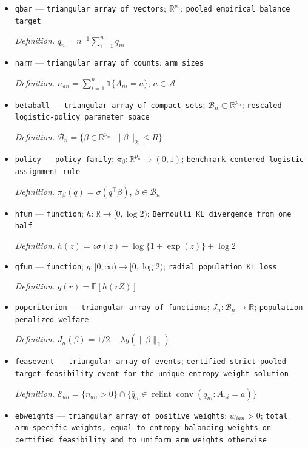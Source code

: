 \documentclass{article}
\begin{document}
\begin{itemize}
  \item \texttt{qbar} --- \texttt{triangular array of vectors}; \(\mathbb R^{p_n}\); \texttt{pooled empirical balance target}
  \par\smallskip\noindent\emph{Definition.} \(\bar q_n=n^{-1}\sum_{i=1}^{n}q_{ni}\)
  \item \texttt{narm} --- \texttt{triangular array of counts}; \texttt{arm sizes}
  \par\smallskip\noindent\emph{Definition.} \(n_{an}=\sum_{i=1}^{n}\mathbf 1\{A_{ni}=a\}\), \(a\in\mathcal A\)
  \item \texttt{betaball} --- \texttt{triangular array of compact sets}; \(\mathcal B_n\subset\mathbb R^{p_n}\); \texttt{rescaled logistic-\allowbreak{}policy parameter space}
  \par\smallskip\noindent\emph{Definition.} \(\mathcal B_n=\{\beta\in\mathbb R^{p_n}:\|\beta\|_2\le R\}\)
  \item \texttt{policy} --- \texttt{policy family}; \(\pi_\beta:\mathbb R^{p_n}\to(0,1)\); \texttt{benchmark-\allowbreak{}centered logistic assignment rule}
  \par\smallskip\noindent\emph{Definition.} \(\pi_\beta(q)=\sigma(q^\top\beta)\), \(\beta\in\mathcal B_n\)
  \item \texttt{hfun} --- \texttt{function}; \(h:\mathbb R\to[0,\log 2)\); \texttt{Bernoulli KL divergence from one half}
  \par\smallskip\noindent\emph{Definition.} \(h(z)=z\sigma(z)-\log\{1+\exp(z)\}+\log 2\)
  \item \texttt{gfun} --- \texttt{function}; \(g:[0,\infty)\to[0,\log 2)\); \texttt{radial population KL loss}
  \par\smallskip\noindent\emph{Definition.} \(g(r)=\mathbb E[h(rZ)]\)
  \item \texttt{popcriterion} --- \texttt{triangular array of functions}; \(J_n:\mathcal B_n\to\mathbb R\); \texttt{population penalized welfare}
  \par\smallskip\noindent\emph{Definition.} \(J_n(\beta)=1/2-\lambda g(\|\beta\|_2)\)
  \item \texttt{feasevent} --- \texttt{triangular array of events}; \texttt{certified strict pooled-\allowbreak{}target feasibility event for the unique entropy-\allowbreak{}weight solution}
  \par\smallskip\noindent\emph{Definition.} \(\mathcal E_{an}=\{n_{an}>0\}\cap\{\bar q_n\in\operatorname{relint}\operatorname{conv}(q_{ni}:A_{ni}=a)\}\)
  \item \texttt{ebweights} --- \texttt{triangular array of positive weights}; \(w_{ian}>0\); \texttt{total arm-\allowbreak{}specific weights,\allowbreak{} equal to entropy-\allowbreak{}balancing weights on certified feasibility and to uniform arm weights otherwise}

\end{itemize}
\end{document}
